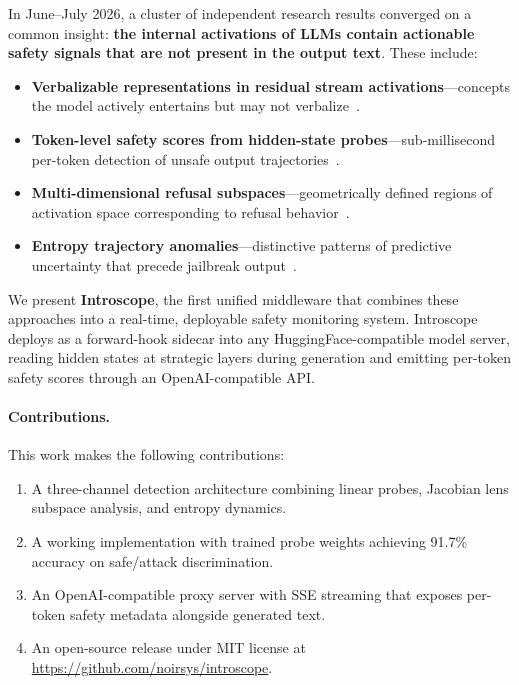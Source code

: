 \documentclass[11pt,twocolumn]{article}
\begin{document}
In June--July 2026, a cluster of independent research results converged on a common insight: \textbf{the internal activations of LLMs contain actionable safety signals that are not present in the output text}. These include:
\begin{itemize}[nosep]
    \item \textbf{Verbalizable representations in residual stream activations}---concepts the model actively entertains but may not verbalize~\cite{anthropic2026workspace}.
    \item \textbf{Token-level safety scores from hidden-state probes}---sub-millisecond per-token detection of unsafe output trajectories~\cite{hiddensstate2026}.
    \item \textbf{Multi-dimensional refusal subspaces}---geometrically defined regions of activation space corresponding to refusal behavior~\cite{rfm2026}.
    \item \textbf{Entropy trajectory anomalies}---distinctive patterns of predictive uncertainty that precede jailbreak output~\cite{entropy2026}.
\end{itemize}

We present \textbf{Introscope}, the first unified middleware that combines these approaches into a real-time, deployable safety monitoring system. Introscope deploys as a forward-hook sidecar into any HuggingFace-compatible model server, reading hidden states at strategic layers during generation and emitting per-token safety scores through an OpenAI-compatible API.

\paragraph{Contributions.}
This work makes the following contributions:
\begin{enumerate}[nosep]
    \item A three-channel detection architecture combining linear probes, Jacobian lens subspace analysis, and entropy dynamics.
    \item A working implementation with trained probe weights achieving 91.7\% accuracy on safe/attack discrimination.
    \item An OpenAI-compatible proxy server with SSE streaming that exposes per-token safety metadata alongside generated text.
    \item An open-source release under MIT license at \url{https://github.com/noirsys/introscope}.
\end{enumerate}
\end{document}
